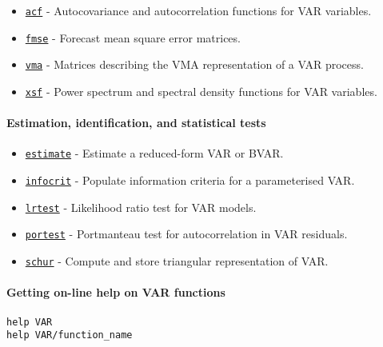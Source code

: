 \begin{itemize}
\itemsep1pt\parskip0pt
\item
  \href{VAR/acf}{\texttt{acf}} - Autocovariance and autocorrelation
  functions for VAR variables.
\item
  \href{VAR/fmse}{\texttt{fmse}} - Forecast mean square error matrices.
\item
  \href{VAR/vma}{\texttt{vma}} - Matrices describing the VMA
  representation of a VAR process.
\item
  \href{VAR/xsf}{\texttt{xsf}} - Power spectrum and spectral density
  functions for VAR variables.
\end{itemize}

\paragraph{Estimation, identification, and statistical
tests}\label{estimation-identification-and-statistical-tests}

\begin{itemize}
\itemsep1pt\parskip0pt
\item
  \href{VAR/estimate}{\texttt{estimate}} - Estimate a reduced-form VAR
  or BVAR.
\item
  \href{VAR/infocrit}{\texttt{infocrit}} - Populate information criteria
  for a parameterised VAR.
\item
  \href{VAR/lrtest}{\texttt{lrtest}} - Likelihood ratio test for VAR
  models.
\item
  \href{VAR/portest}{\texttt{portest}} - Portmanteau test for
  autocorrelation in VAR residuals.
\item
  \href{VAR/schur}{\texttt{schur}} - Compute and store triangular
  representation of VAR.
\end{itemize}

\paragraph{Getting on-line help on VAR
functions}\label{getting-on-line-help-on-var-functions}

\begin{verbatim}
help VAR
help VAR/function_name
\end{verbatim}



